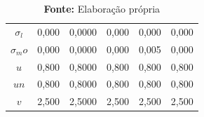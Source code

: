 \begin{table}[H]
\begin{tabular}{cccccc}
\textbf{$\sigma_l$ } &          0,000 &        0,0000 &            0,000 &        0,000 &            0,000 \\
\textbf{$\sigma_mo$} &          0,000 &        0,0000 &            0,000 &        0,005 &            0,000 \\
\textbf{$u$        } &          0,800 &        0,8000 &            0,800 &        0,800 &            0,800 \\
\textbf{$un$       } &          0,800 &        0,8000 &            0,800 &        0,800 &            0,800 \\
\textbf{$v$        } &          2,500 &        2,5000 &            2,500 &        2,500 &            2,500 \\
\bottomrule
\end{tabular}
    \label{Summary_Simplest}
    \caption*{\textbf{Fonte:} Elaboração própria}
\end{table}

